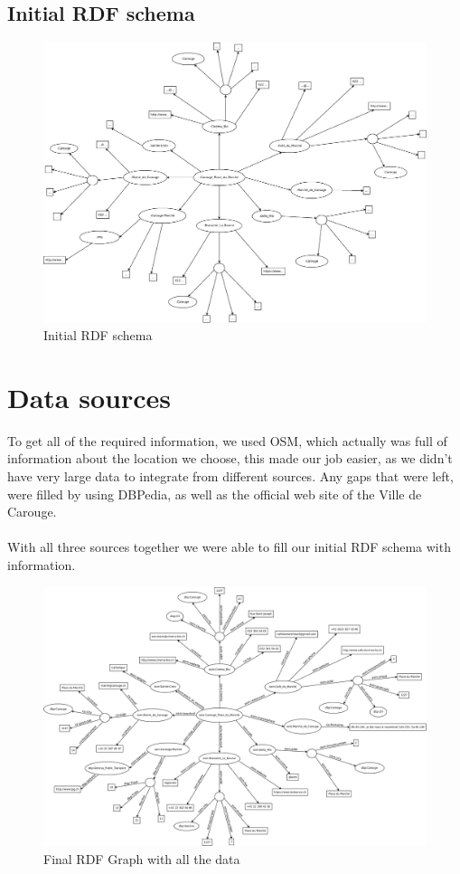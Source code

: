\documentclass[a4paper]{article}
\begin{document}
\subsection*{Initial RDF schema}
\begin{figure}[H]
\center
\includegraphics[width=1.1\textwidth]{images/Graph_init.PNG}
\caption{Initial RDF schema}
\end{figure}
\section*{Data sources}
To get all of the required information, we used OSM, which actually was full of information about the location we choose, this made our job easier, as we didn't have very large data to integrate from different sources. Any gaps that were left, were filled by using DBPedia, as well as the official web site of the Ville de Carouge.\\\\ With all three sources together we were able to fill our initial RDF schema with information.

\begin{figure}[H]
\center
\includegraphics[width=1.1\textwidth]{images/Graph.PNG}
\caption{Final RDF Graph with all the data}
\end{figure}
\end{document}
